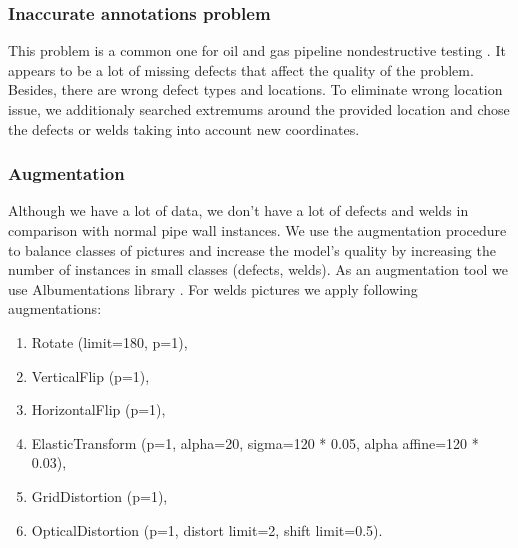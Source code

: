 \subsubsection{Inaccurate annotations problem}
This problem is a common one for oil and gas pipeline nondestructive testing \cite{Khodayari-Rostamabad2009}.
It appears to be a lot of missing defects that affect the quality of the problem.
Besides, there are wrong defect types and locations.
To eliminate wrong location issue, we additionaly searched extremums around the provided location and chose the defects or welds taking into account new coordinates.

\subsubsection{Augmentation}
Although we have a lot of data, we don't have a lot of defects and welds in comparison with normal pipe wall instances.
We use the augmentation procedure to balance classes of pictures and increase the model's quality by increasing the number of instances in small classes (defects, welds).
As an augmentation tool we use Albumentations library \cite{buslaev2020albumentations}.
For welds pictures we apply following augmentations:
\begin{enumerate}
	\item Rotate (limit=180, p=1),
	\item VerticalFlip (p=1), 
	\item HorizontalFlip (p=1), 
	\item ElasticTransform (p=1, alpha=20, sigma=120 * 0.05, alpha affine=120 * 0.03), 
	\item GridDistortion (p=1),
	\item OpticalDistortion (p=1, distort limit=2, shift limit=0.5).
\end{enumerate}

